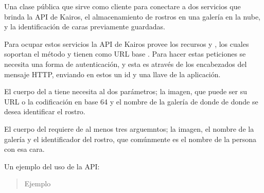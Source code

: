 \begin{fulllineitems}
\label{\detokenize{chapter_two/desc_cloudnao:app.tpa_client_libraries.kairos_client.Kairos}}
Una clase pública que sirve como cliente para conectare a dos servicios
que brinda la API de Kairos, el almacenamiento de rostros en una galería en la nube, y
la identificación de caras previamente guardadas.

Para ocupar estos servicios la API de Kairos provee los recursos  y
, los cuales soportan el método  y tienen como
URL base . Para hacer estas peticiones se
necesita una forma de autenticación, y esta es através de los encabezados
del mensaje HTTP, enviando en estos un id y una llave de la aplicación.

El cuerpo del  a  tiene necesita al dos parámetros; la
imagen, que puede ser su URL o la codificación en base 64
y el nombre de la galería de donde de donde se desea identificar el rostro.

\begin{sphinxVerbatim}[commandchars=\\\{\}]
      
      
\end{sphinxVerbatim}

El cuerpo del  requiere de al menos tres arguemntos;
la imagen, el nombre de la galería y el identificador del rostro, que
comúnmente es el nombre de la persona con esa cara.

\begin{sphinxVerbatim}[commandchars=\\\{\}]
      
      
      
\end{sphinxVerbatim}

Un ejemplo del uso de la API:
\begin{quote}\begin{description}
\item[{Ejemplo}] \leavevmode
\end{description}\end{quote}


\end{fulllineitems}
